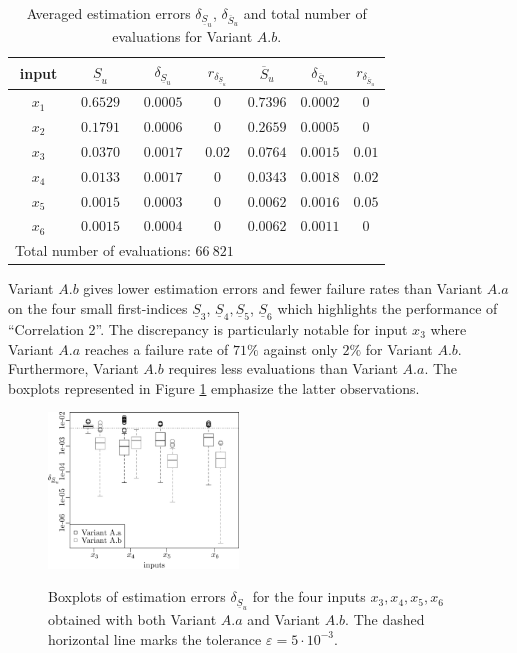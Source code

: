 \begin{table}[!ht]
\caption{Averaged estimation errors $\delta_{\underline{S}_u}$, $\delta_{\overline{S}_u}$ and total number of evaluations for Variant $A.b$.}
\centering
\begin{tabular}{ccccccc}
\hline
 input & $\underline{S}_u$ & $\delta_{\underline{S}_u}$ & $r_{\delta_{\underline{S}_u}}$ & $\overline{S}_u$ & $\delta_{\overline{S}_u}$ & $r_{\delta_{\overline{S}_u}}$ \\ \hline
 $x_1$ & $0.6529$ &  $0.0005$ & $0$ & $0.7396$ & $0.0002$ & $0$ \\ \hline
 $x_2$ & $0.1791$ &  $0.0006$ & $0$ & $0.2659$ & $0.0005$ & $0$ \\ \hline
 $x_3$ & $0.0370$ &  $0.0017$ & $0.02$ & $0.0764$ & $0.0015$ & $0.01$ \\ \hline
 $x_4$ & $0.0133$ &  $0.0017$ & $0$ & $0.0343$ & $0.0018$ & $0.02$ \\ \hline
 $x_5$ & $0.0015$ &  $0.0003$ & $0$ & $0.0062$ & $0.0016$ & $0.05$ \\ \hline
 $x_6$ & $0.0015$ &  $0.0004$ & $0$  & $0.0062$ & $0.0011$ & $0$ \\ \hline \hline
\multicolumn{4}{l}{Total number of evaluations: $66 \ 821$} & & &\\ \hline 
\end{tabular}
\label{res.bratley.Ab}
\end{table}

Variant $A.b$ gives lower estimation errors and fewer failure rates than Variant $A.a$ on the four small first-indices $\underline{S}_3$, $\underline{S}_4,\underline{S}_5$, $\underline{S}_6$ which highlights the performance of ``Correlation 2''. The discrepancy is particularly notable for input $x_3$ where Variant $A.a$ reaches a failure rate of $71\%$ against only $2\%$ for Variant $A.b$. Furthermore, Variant $A.b$ requires less evaluations than Variant $A.a$. The boxplots represented in Figure \ref{boxplots.bratley} emphasize the latter observations.
\begin{figure}[t]
\caption{Boxplots of estimation errors $\delta_{\underline{S}_u}$ for the four inputs $x_3,x_4,x_5,x_6$ obtained with both Variant $A.a$ and Variant $A.b$. The dashed horizontal line marks the tolerance $\varepsilon=5\cdot 10^{-3}$.}
\vspace*{0.2cm}
\centering
\includegraphics[width=0.45\textwidth]{bratley_box.eps}
\label{boxplots.bratley}
\end{figure}


